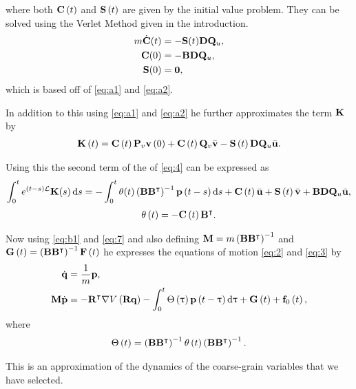 where both $\mathbf{C}\left( t \right)$ and $\mathbf{S}\left( t \right)$ are given by the initial value problem. They can be solved using the Verlet Method given in the introduction.
\begin{align*}
m\dot{\mathbf{C}}(t) & = -\mathbf{S}(t)\mathbf{D}\mathbf{Q}_u,\\
\mathbf{C}(0) &= -\mathbf{B}\mathbf{D}\mathbf{Q}_u,\\
\mathbf{S}(0) & = \mathbf{0},
\end{align*}
which is based off of \eqref{eq:a1} and \eqref{eq:a2}. 

In addition to this using \eqref{eq:a1} and \eqref{eq:a2} he further approximates the term $\mathbf{K}$ by 
\begin{align}
\mathbf{K}\left( t \right) = \mathbf{C}\left( t \right)\mathbf{P}_v\mathbf{v}\left( 0 \right) + \mathbf{C}\left(t\right)\mathbf{Q}_v\bar{\mathbf{v}}-\mathbf{S}\left(t\right)\mathbf{D}\mathbf{Q}_u\bar{\mathbf{u}}.\\
\end{align}

Using this the second term of the of \eqref{eq:4} can be expressed as 
\begin{align}
\int_{0}^{t} e^{(t-s)\mathbf{\mathcal{L}}}\mathbf{K}(s) \mathop{}\!\mathrm{d} s = -\int_{0}^{t} \theta(t) \left(\mathbf{B} \mathbf{B}^{\intercal}\right)^{-1} \mathbf{p}\left(t-s\right) \mathop{}\!\mathrm{d} s +\mathbf{C}\left(t\right) \bar{\mathbf{u}} + \mathbf{S}\left(t\right)\bar{\mathbf{v}} + \mathbf{B}\mathbf{D}\mathbf{Q}_u\bar{\mathbf{u}},\label{eq:b1}
\end{align}
\begin{align*}
\theta\left(t\right) = -\mathbf{C}\left(t\right)\mathbf{B}^{\intercal}.
\end{align*}

Now using \eqref{eq:b1} and \eqref{eq:7} and also defining $\mathbf{M} = m\left(\mathbf{B}\mathbf{B}^{\intercal}\right)^{-1}$ and $\mathbf{G}\left(t\right) = \left(\mathbf{B}\mathbf{B}^{\intercal}\right)^{-1}\mathbf{F}\left(t\right) $ he expresses the equations of motion \eqref{eq:2} and \eqref{eq:3} by 
\begin{align}
\dot{\mathbf{q}} & = \frac{1}{m}\mathbf{p},\label{eq:q}\\
\mathbf{M}\dot{\mathbf{p}} & = -\mathbf{R}^{\intercal} \nabla V \left(\mathbf{R}\mathbf{q} \right) - \int_{0}^{t} \Theta\left(\uptau\right)\mathbf{p}\left(t-\uptau\right) \mathop{}\!\mathrm{d} \uptau +\mathbf{G}\left(t\right) + \mathbf{f}_0\left(t\right),\label{eq:p}
\end{align}
where
\begin{align}
\Theta\left( t\right) = \left(\mathbf{B}\mathbf{B}^{\intercal}\right)^{-1}\theta\left(t\right)\left(\mathbf{B}\mathbf{B}^{\intercal}\right)^{-1}.
\end{align}

This is an approximation of the dynamics of the coarse-grain variables that we have selected.